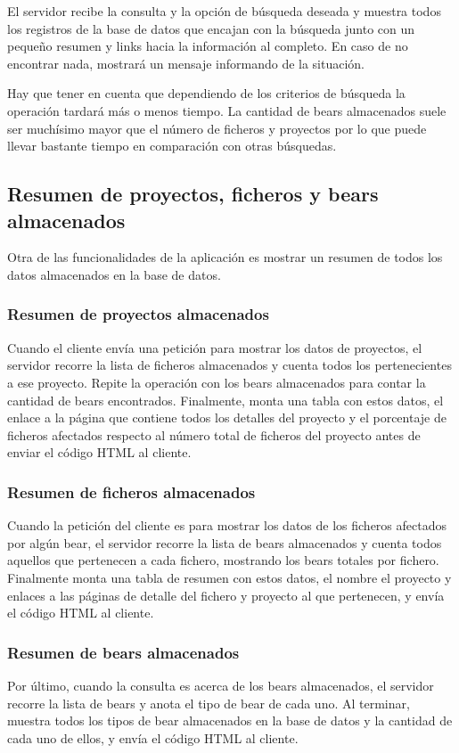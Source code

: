 \documentclass[a4paper, 12pt]{book}
\begin{document}
El servidor recibe la consulta y la opción de búsqueda deseada y muestra todos los registros de la base de datos que encajan con la búsqueda junto con un pequeño resumen y links hacia la información al completo. En caso de no encontrar nada, mostrará un mensaje informando de la situación.

Hay que tener en cuenta que dependiendo de los criterios de búsqueda la operación tardará más o menos tiempo. La cantidad de bears almacenados suele ser muchísimo mayor que el número de ficheros y proyectos por lo que puede llevar bastante tiempo en comparación con otras búsquedas.

\subsection{Resumen de proyectos, ficheros y bears almacenados}
\label{sec:seccion12.3}
Otra de las funcionalidades de la aplicación es mostrar un resumen de todos los datos almacenados en la base de datos.

\subsubsection{Resumen de proyectos almacenados}
\label{sec:section12.3.1}
Cuando el cliente envía una petición para mostrar los datos de proyectos, el servidor recorre la lista de ficheros almacenados y cuenta todos los pertenecientes a ese proyecto. Repite la operación con los bears almacenados para contar la cantidad de bears encontrados. Finalmente, monta una tabla con estos datos, el enlace a la página que contiene todos los detalles del proyecto y el porcentaje de ficheros afectados respecto al número total de ficheros del proyecto antes de enviar el código HTML al cliente.

\subsubsection{Resumen de ficheros almacenados}
\label{sec:section12.3.2}
Cuando la petición del cliente es para mostrar los datos de los ficheros afectados por algún bear, el servidor recorre la lista de bears almacenados y cuenta todos aquellos que pertenecen a cada fichero, mostrando los bears totales por fichero. Finalmente monta una tabla de resumen con estos datos, el nombre el proyecto y enlaces a las páginas de detalle del fichero y proyecto al que pertenecen, y envía el código HTML al cliente.

\subsubsection{Resumen de bears almacenados}
\label{sec:section12.3.3}
Por último, cuando la consulta es acerca de los bears almacenados, el servidor recorre la lista de bears y anota el tipo de bear de cada uno. Al terminar, muestra todos los tipos de bear almacenados en la base de datos y la cantidad de cada uno de ellos, y envía el código HTML al cliente. 
\end{document}
